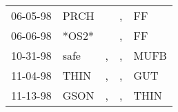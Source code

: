 \begin{supertabular}{p{0.07\textwidth}p{0.06\textwidth}p{0.02\textwidth}p{0.02\textwidth}p{0.06\textwidth}}
 06-05-98\textsuperscript{} &  PRCH\textsuperscript{} &    &  , &    FF\textsuperscript{} \\
 06-06-98\textsuperscript{} &                   *OS2* &    &  , &    FF\textsuperscript{} \\
 10-31-98\textsuperscript{} &  safe\textsuperscript{} &  , &  , &  MUFB\textsuperscript{} \\
 11-04-98\textsuperscript{} &  THIN\textsuperscript{} &  , &  , &   GUT\textsuperscript{} \\
 11-13-98\textsuperscript{} &  GSON\textsuperscript{} &  , &  , &  THIN\textsuperscript{} \\
\end{supertabular}
